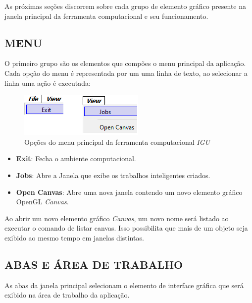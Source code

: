 As próximas seções discorrem sobre cada grupo de elemento gráfico presente na janela principal da ferramenta computacional e seu funcionamento.

\subsection{MENU}\label{sec:menu}

O primeiro grupo são os elementos que compões o menu principal da aplicação. Cada opção do menu é representada por um uma linha de texto, ao selecionar a linha uma ação é executada:

\begin{figure}[!htbp]
	\centering
	\includegraphics[scale=1]{Figures/IGU_016.png}
	\caption{Opções do menu principal da ferramenta computacional \textit{IGU}}
	\label{fig:menu}
\end{figure}


\begin{itemize}
	\item \textbf{Exit}: Fecha o ambiente computacional.
	\item \textbf{Jobs}: Abre a Janela que exibe os trabalhos inteligentes criados.
	\item \textbf{Open Canvas}: Abre uma nova janela contendo um novo elemento gráfico OpenGL \textit{Canvas}.
\end{itemize}

Ao abrir um novo elemento gráfico \textit{Canvas}, um novo nome será listado ao executar o comando de listar canvas. Isso possibilita que mais de um objeto seja exibido ao mesmo tempo em janelas distintas.

\subsection{ABAS E ÁREA DE TRABALHO}\label{sec:abas}

As abas da janela principal selecionam o elemento de interface gráfica que será exibido na área de trabalho da aplicação.

